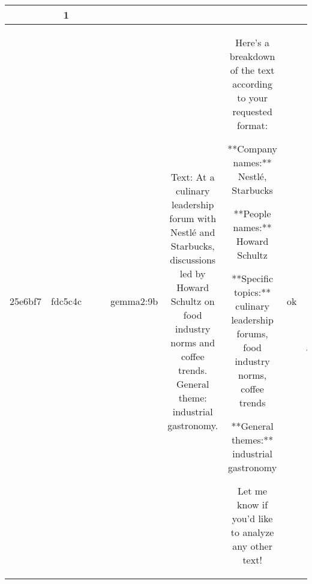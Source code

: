 \begin{table}[h!]
\begin{tabular}{|c|c|c|c|c|c|c|c|c|c|}
{1. **Format**: The output follows the format specified:
   - "Company names" section is listed first.
   - Followed by "People names", then "Specific topics", and finally "General themes".

2. **Elements Presence**: 
   - Each section has a label followed by a colon and a list (even if some lists are empty).
   - Company names: Provided ("Nestlé, Starbucks").
   - People names: Provided ("Howard Schultz").
   - Specific topics: Provided ("food industry norms, coffee trends").
   - General themes: Provided ("industrial gastronomy").

3. **Compliance Criteria**: The compliance check does not require the correctness of these elements, only that they are present in the expected format. Based on the provided description, the chatbot's output is in compliance with the desired structure.

Considering the above points, there is no violation of the compliance criteria specified in the description.

OK & 1\\
\hline
25e6bf7 & fdc5c4c &  &  & gemma2:9b & Text: At a culinary leadership forum with Nestlé and Starbucks, discussions led by Howard Schultz on food industry norms and coffee trends. General theme: industrial gastronomy. & Here's a breakdown of the text according to your requested format:

**Company names:** Nestlé, Starbucks

**People names:** Howard Schultz 

**Specific topics:** culinary leadership forums, food industry norms, coffee trends

**General themes:**  industrial gastronomy 


Let me know if you'd like to analyze any other text! 
 & ok & The chatbot output presents a breakdown of the text according to the requested format specified in the description. The categories outlined—Company names, People names, Specific topics, and General themes—are all present, indicating compliance with the format requirement. Each category is followed by a colon and contains a list of items separated by commas, as specified in the desired format.

However, there is a minor inconsistency noted in the output: while the description mandates the use of "<comma_separated_list_of_company_names>" and similar formats, the symbols "<" and ">" are not present in the output. Nonetheless, this can be viewed as an oversight of the literal formatting guideline, as there isn't any ambiguity in the lists provided. Despite this, other aspects, such as not providing a comma-separated list for people names, topics, and themes, align with the request.

}
\end{tabular}
\end{table}
